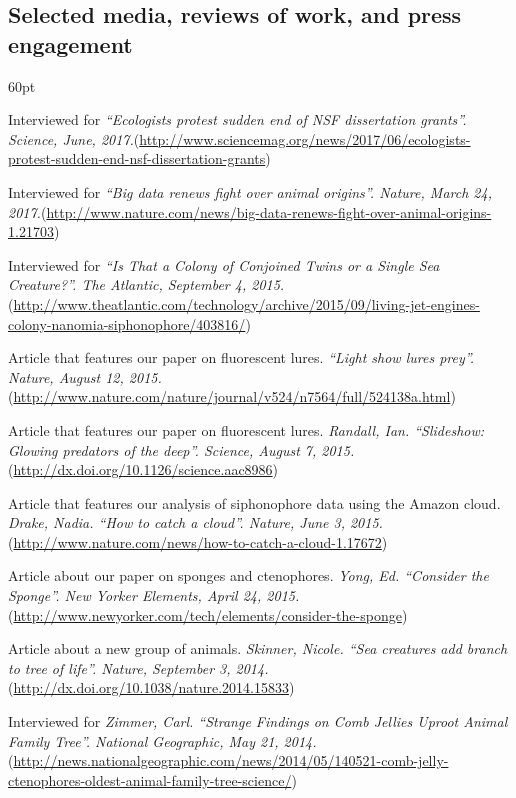 \subsection{Selected media, reviews of work, and press engagement}

\begin{entry}{60pt}

\item [\rm 2017] Interviewed for \emph{``Ecologists protest sudden end of NSF dissertation grants''. Science, June, 2017.}(\url{http://www.sciencemag.org/news/2017/06/ecologists-protest-sudden-end-nsf-dissertation-grants})
\item [\rm 2017] Interviewed for \emph{``Big data renews fight over animal origins''. Nature, March 24, 2017.}(\url{http://www.nature.com/news/big-data-renews-fight-over-animal-origins-1.21703})
\item [\rm 2015] Interviewed for \emph{``Is That a Colony of Conjoined Twins or a Single Sea Creature?''. The Atlantic, September 4, 2015.}(\url{http://www.theatlantic.com/technology/archive/2015/09/living-jet-engines-colony-nanomia-siphonophore/403816/})
\item [\rm 2015] Article that features our paper on fluorescent lures. \emph{``Light show lures prey''. Nature, August 12, 2015.}(\url{http://www.nature.com/nature/journal/v524/n7564/full/524138a.html})
\item [\rm 2015] Article that features our paper on fluorescent lures. \emph{Randall, Ian. ``Slideshow: Glowing predators of the deep''. Science, August 7, 2015.}(\url{http://dx.doi.org/10.1126/science.aac8986})
\item [\rm 2015] Article that features our analysis of siphonophore data using the Amazon cloud. \emph{Drake, Nadia. ``How to catch a cloud''. Nature, June 3, 2015.}(\url{http://www.nature.com/news/how-to-catch-a-cloud-1.17672})
\item [\rm 2015] Article about our paper on sponges and ctenophores. \emph{Yong, Ed. ``Consider the Sponge''. New Yorker Elements, April 24, 2015.}(\url{http://www.newyorker.com/tech/elements/consider-the-sponge})
\item [\rm 2014] Article about a new group of animals. \emph{Skinner, Nicole. ``Sea creatures add branch to tree of life''. Nature, September 3, 2014.}(\url{http://dx.doi.org/10.1038/nature.2014.15833})
\item [\rm 2014] Interviewed for \emph{Zimmer, Carl. ``Strange Findings on Comb Jellies Uproot Animal Family Tree''. National Geographic, May 21, 2014.} (\url{http://news.nationalgeographic.com/news/2014/05/140521-comb-jelly-ctenophores-oldest-animal-family-tree-science/})

\end{entry}
